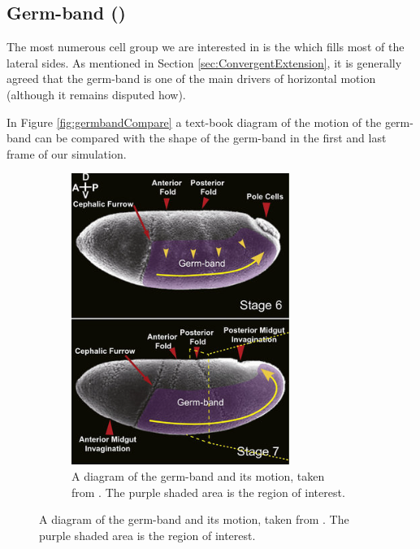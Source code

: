\subsection{Germ-band ()}
The most numerous cell group we are interested in is the  which fills most of the lateral sides. As mentioned in Section \ref{sec:ConvergentExtension}, it is generally agreed that the germ-band is one of the main drivers of horizontal motion (although it remains disputed how).

In Figure \ref{fig:germbandCompare} a text-book diagram of the motion of the germ-band can be compared with the shape of the germ-band in the first and last frame of our simulation. 
\begin{figure}[H]
    \centering
    \begin{subfigure}[b]{0.3\textwidth}
        \includegraphics[width=\textwidth]{chapters/Results/figures/compareGB.png}
    \caption{A diagram of the germ-band and its motion, taken from . The purple shaded area is the region of interest. }

\end{subfigure}
\end{figure}

